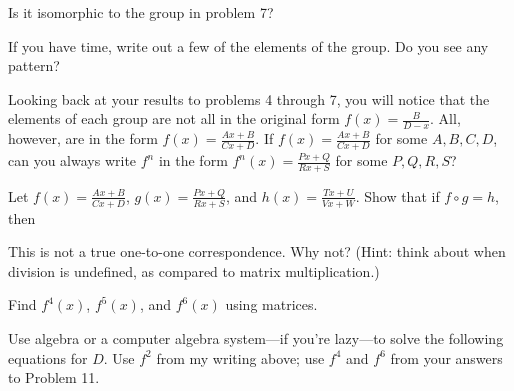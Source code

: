 \documentclass[../gatm_answers.tex]{subfiles}
\begin{document}
\begin{inner_problem}
\item Is it isomorphic to the group in problem 7?
\end{inner_problem}

\begin{inner_problem}
\item If you have time, write out a few of the elements of the group. Do you see any pattern?
\end{inner_problem}

\begin{outer_problem}
\item Looking back at your results to problems 4 through 7, you will notice that the elements of each group are not all in the original form $f(x)=\frac{B}{D-x}$. All, however, are in the form $f(x)=\frac{Ax+B}{Cx+D}$. If $f(x)=\frac{Ax+B}{Cx+D}$ for some $A,B,C,D$, can you always write $f^n$ in the form $f^n(x)=\frac{Px+Q}{Rx+S}$ for some $P,Q,R,S$?
\end{outer_problem}

\begin{outer_problem}
\item
\end{outer_problem}

\begin{inner_problem}[start=1]
\item Let $f(x)=\frac{Ax+B}{Cx+D}$, $g(x)=\frac{Px+Q}{Rx+S}$, and $h(x)=\frac{Tx+U}{Vx+W}$. Show that if $f\circ g = h$, then
\end{inner_problem}

\begin{inner_problem}
\item This is not a true one-to-one correspondence. Why not? (Hint: think about when division is undefined, as compared to matrix multiplication.)
\end{inner_problem}

\begin{outer_problem}
\item Find $f^4(x)$, $f^5(x)$, and $f^6(x)$ using matrices.
\end{outer_problem}

\begin{outer_problem}
\item Use algebra or a computer algebra system---if you're lazy---to solve the following equations for $D$. Use $f^2$ from my writing above; use $f^4$ and $f^6$ from your answers to Problem 11.
\end{outer_problem}
\end{document}
